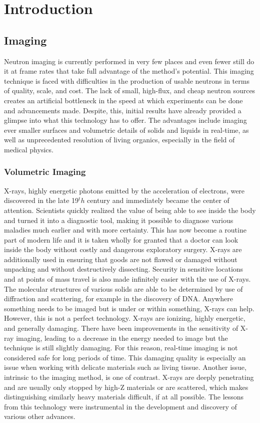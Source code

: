 \label{sec:introduction}
\section{Introduction}

\subsection{Imaging}

Neutron imaging is currently performed in very few places and even fewer still do it at frame rates that take full advantage of the method's potential. This imaging technique is faced with difficulties in the production of usable neutrons in terms of quality, scale, and cost. The lack of small, high-flux, and cheap neutron sources creates an artificial bottleneck in the speed at which experiments can be done and advancements made. Despite, this, initial results have already provided a glimpse into what this technology has to offer. The advantages include imaging ever smaller surfaces and volumetric details of solids and liquids in real-time, as well as unprecedented resolution of living organics, especially in the field of medical physics.

\subsubsection{Volumetric Imaging}
X-rays, highly energetic photons emitted by the acceleration of electrons, were discovered in the late 19$^th$ century and immediately became the center of attention. Scientists quickly realized the value of being able to see inside the body and turned it into a diagnostic tool, making it possible to diagnose various maladies much earlier and with more certainty. This has now become a routine part of modern life and it is taken wholly for granted that a doctor can look inside the body without costly and dangerous exploratory surgery. X-rays are additionally used in ensuring that goods are not flawed or damaged without unpacking and without destructively dissecting. Security in sensitive locations and at points of mass travel is also made infinitely easier with the use of X-rays. The molecular structures of various solids are able to be determined by use of diffraction and scattering, for example in the discovery of DNA. Anywhere something needs to be imaged but is under or within something, X-rays can help. However, this is not a perfect technology. X-rays are ionizing, highly energetic, and generally damaging. There have been improvements in the sensitivity of X-ray imaging, leading to a decrease in the energy needed to image but the technique is still slightly damaging. For this reason, real-time imaging is not considered safe for long periods of time. This damaging quality is especially an issue when working with delicate materials such as living tissue. Another issue, intrinsic to the imaging method, is one of contrast. X-rays are deeply penetrating and are usually only stopped by high-Z materials or are scattered, which makes distinguishing similarly heavy materials difficult, if at all possible. The lessons from this technology were instrumental in the development and discovery of various other advances.\\

